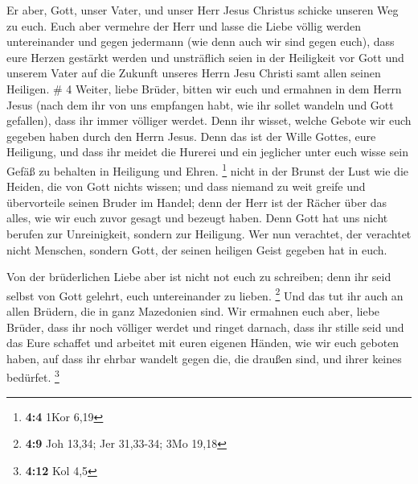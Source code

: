  Er aber, Gott, unser Vater, und unser Herr Jesus Christus
schicke unseren Weg zu euch.  Euch aber vermehre der Herr
und lasse die Liebe völlig werden untereinander und gegen jedermann (wie
denn auch wir sind gegen euch),  dass eure Herzen gestärkt
werden und unsträflich seien in der Heiligkeit vor Gott und unserem
Vater auf die Zukunft unseres Herrn Jesu Christi samt allen seinen
Heiligen. \# 4  Weiter, liebe Brüder, bitten wir euch und
ermahnen in dem Herrn Jesus (nach dem ihr von uns empfangen habt, wie
ihr sollet wandeln und Gott gefallen), dass ihr immer völliger werdet.
 Denn ihr wisset, welche Gebote wir euch gegeben haben durch
den Herrn Jesus.  Denn das ist der Wille Gottes, eure
Heiligung, und dass ihr meidet die Hurerei  und ein
jeglicher unter euch wisse sein Gefäß zu behalten in Heiligung und
Ehren. \footnote{\textbf{4:4} 1Kor 6,19}  nicht in der
Brunst der Lust wie die Heiden, die von Gott nichts wissen; 
und dass niemand zu weit greife und übervorteile seinen Bruder im
Handel; denn der Herr ist der Rächer über das alles, wie wir euch zuvor
gesagt und bezeugt haben.  Denn Gott hat uns nicht berufen
zur Unreinigkeit, sondern zur Heiligung.  Wer nun verachtet,
der verachtet nicht Menschen, sondern Gott, der seinen heiligen Geist
gegeben hat in euch.

 Von der brüderlichen Liebe aber ist nicht not euch zu
schreiben; denn ihr seid selbst von Gott gelehrt, euch untereinander zu
lieben. \footnote{\textbf{4:9} Joh 13,34; Jer 31,33-34; 3Mo 19,18}
 Und das tut ihr auch an allen Brüdern, die in ganz
Mazedonien sind. Wir ermahnen euch aber, liebe Brüder, dass ihr noch
völliger werdet  und ringet darnach, dass ihr stille seid
und das Eure schaffet und arbeitet mit euren eigenen Händen, wie wir
euch geboten haben,  auf dass ihr ehrbar wandelt gegen die,
die draußen sind, und ihrer keines bedürfet. \footnote{\textbf{4:12} Kol
  4,5}

